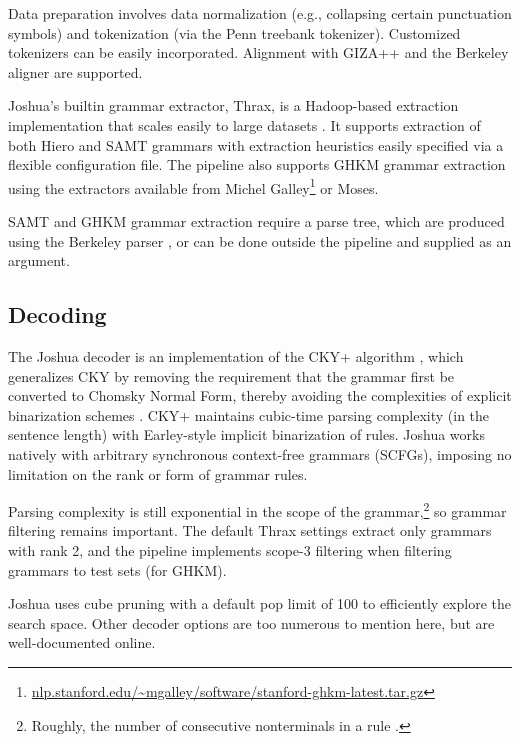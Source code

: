 \documentclass[11pt]{article}
\begin{document}
Data preparation involves data normalization (e.g., collapsing certain
punctuation symbols) and tokenization (via the Penn treebank
tokenizer).  Customized tokenizers can be easily incorporated.
Alignment with GIZA++ \cite{giza} and the Berkeley aligner
\cite{berkeley-aligner} are supported.

Joshua's builtin grammar extractor, Thrax, is a Hadoop-based
extraction implementation that scales easily to large
datasets \cite{PPDB}.  It supports extraction of both Hiero
\cite{Chiang2005} and SAMT grammars \cite{samt2006} with extraction
heuristics easily specified via a flexible configuration file. The
pipeline also supports GHKM grammar extraction
\cite{galley2006scalable} using the extractors available from Michel
Galley\footnote{\url{nlp.stanford.edu/~mgalley/software/stanford-ghkm-latest.tar.gz}}
or Moses.

SAMT and GHKM grammar extraction require a parse tree, which are
produced using the Berkeley parser \cite{petrov2006learning}, or can
be done outside the pipeline and supplied as an argument.

\subsection{Decoding}

The Joshua decoder is an implementation of the CKY+ algorithm
\cite{chappelier1998generalized}, which generalizes CKY by removing
the requirement that the grammar first be converted to Chomsky Normal
Form, thereby avoiding the complexities of explicit binarization schemes
\cite{zhang2006synchronous,denero2009asynchronous}. CKY+ maintains
cubic-time parsing complexity (in the sentence length) with
Earley-style implicit binarization of rules. Joshua works natively
with arbitrary synchronous context-free grammars (SCFGs), imposing no
limitation on the rank or form of grammar rules. 

Parsing complexity is still exponential in the scope of the
grammar,\footnote{Roughly, the number of consecutive nonterminals in a
  rule \cite{hopkins2010scfg}.} so grammar filtering remains
important.  The default Thrax settings extract only grammars with rank
2, and the pipeline implements scope-3 filtering \cite{hopkins2010scfg}
when filtering grammars to test sets (for GHKM).

Joshua uses cube pruning \cite{Chiang2007} with a default pop limit of
100 to efficiently explore the search space. Other decoder options are
too numerous to mention here, but are well-documented online.
\end{document}
